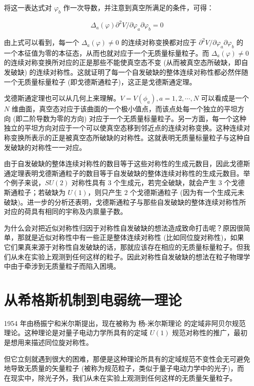 \documentclass[oneside,a4paper,openany,11pt]{ctexbook}
\begin{document}
\noindent 将这一表达式对 $\varphi_b$ 作一次导数，并注意到真空所满足的条件，可得：

\begin{equation}
    \Delta_a(\varphi) \partial^2 V/\partial \varphi_a \partial \varphi_b=0
\end{equation}

\noindent 由上式可以看到，每一个 $\Delta_a(\varphi) \ne 0$ 的连续对称变换都对应于 $\partial^2 V/\partial \varphi_a \partial \varphi_b$ 的一个本征值为零的本征态，从而也就对应于一个无质量标量粒子。而 $\Delta_a(\varphi) \ne 0$ 的连续对称变换所对应的正是那些不能使真空态不变 (从而被真空态所破缺，即自发破缺) 的连续对称性。这就证明了每一个自发破缺的整体连续对称性都必然伴随一个无质量标量粒子 (即戈德斯通粒子)，这正是戈德斯通定理。

戈德斯通定理也可以从几何上来理解。$V=V(\phi_a), a=1, 2, \cdots, N$ 可以看成是一个 $N$ 维曲面，真空态对应于该曲面的一个极小值点，而该点处每一个独立的平坦方向 (即二阶导数为零的方向) 对应于一个无质量标量粒子。另一方面，每一个这种独立的平坦方向对应于一个可以使真空态移到邻近点的连续对称变换。这种连续对称变换所表示的正是被真空态所破缺的对称性。这就表明无质量标量粒子与这种自发破缺的对称性一一对应。

由于自发破缺的整体连续对称性的数目等于这些对称性的生成元数目，因此戈德斯通定理表明戈德斯通粒子的数目等于自发破缺的整体连续对称性的生成元数目。举个例子来说，$SU(2)$ 对称性具有 $3$ 个生成元，若完全破缺，就会产生 $3$ 个戈德斯通粒子；若破缺为 $U(1)$，则只产生 $2$ 个戈德斯通粒子 (因为有一个生成元未破缺)。进一步的分析还表明，戈德斯通粒子与那些自发破缺的整体连续对称性所对应的荷具有相同的宇称及内禀量子数。

为什么会对把近似对称性归因于对称性自发破缺的想法造成致命打击呢？原因很简单，那就是近似对称性中有一些正是整体连续对称性 (比如同位旋对称性)，如果它们果真来源于对称性自发破缺的话，那就应该存在相应的无质量标量粒子。但我们从未在实验上观测到任何这样的粒子。因此对称性自发破缺的想法在粒子物理学中由于牵涉到无质量粒子而陷入困境。

\section{从希格斯机制到电弱统一理论}

1954 年由杨振宁和米尔斯提出，现在被称为 杨-米尔斯理论 的定域非阿贝尔规范理论。这种理论是对量子电动力学所具有的定域 $U(1)$ 规范对称性的推广，最初是想用来描述同位旋对称性。

但它立刻就遇到很大的困难，那便是这种理论所具有的定域规范不变性会无可避免地导致无质量的矢量粒子 (被称为规范粒子，类似于量子电动力学中的光子)，而在现实中，除光子外，我们从未在实验上观测到任何这样的无质量矢量粒子。
\end{document}
